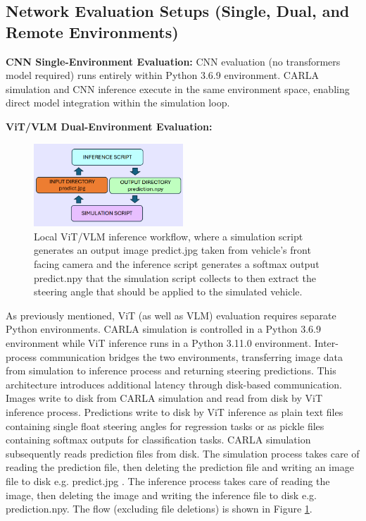 \subsection{Network Evaluation Setups (Single, Dual, and Remote Environments)}

\textbf{CNN Single-Environment Evaluation:} CNN evaluation (no transformers model required) runs entirely within Python 3.6.9 environment. CARLA simulation and CNN inference execute in the same environment space, enabling direct model integration within the simulation loop.

\textbf{ViT/VLM Dual-Environment Evaluation:}
\begin{figure}[h]
\centering
\includegraphics[width=0.50\textwidth]{Figures/Methods/LocalVLMInference.png}
\caption{Local ViT/VLM inference workflow, where a simulation script generates an output image predict.jpg taken from vehicle's front facing camera and the inference script generates a softmax output predict.npy that the simulation script collects to then extract the steering angle that should be applied to the simulated vehicle.}
\label{fig:LocalVLMInference}
\end{figure}

As previously mentioned, ViT (as well as VLM) evaluation requires separate Python environments. CARLA simulation is controlled in a Python 3.6.9 environment while ViT inference runs in a Python 3.11.0 environment. Inter-process communication bridges the two environments, transferring image data from simulation to inference process and returning steering predictions. This architecture introduces additional latency through disk-based communication. Images write to disk from CARLA simulation and read from disk by ViT inference process. Predictions write to disk by ViT inference as plain text files containing single float steering angles for regression tasks or as pickle files containing softmax outputs for classification tasks. CARLA simulation subsequently reads prediction files from disk. The simulation process takes care of reading the prediction file, then deleting the prediction file and writing an image file to disk e.g. predict.jpg . The inference process takes care of reading the image, then deleting the image and writing the inference file to disk e.g. prediction.npy. The flow (excluding file deletions) is shown in Figure \ref{fig:LocalVLMInference}.

